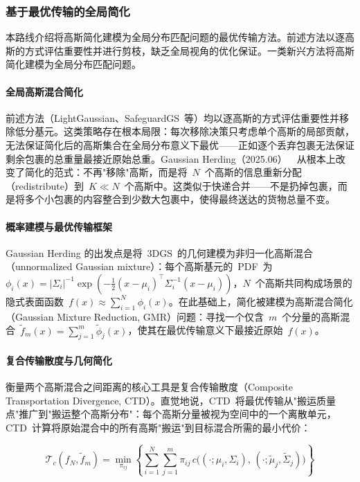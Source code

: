 \subsubsection{基于最优传输的全局简化}

本路线介绍将高斯简化建模为全局分布匹配问题的最优传输方法。前述方法以逐高斯的方式评估重要性并进行剪枝，缺乏全局视角的优化保证。一类新兴方法将高斯简化建模为全局分布匹配问题。

\paragraph{全局高斯混合简化}

前述方法（LightGaussian、SafeguardGS~等）均以逐高斯的方式评估重要性并移除低分基元。这类策略存在根本局限：每次移除决策只考虑单个高斯的局部贡献，无法保证简化后的高斯集合在全局分布意义下最优——正如逐个丢弃包裹无法保证剩余包裹的总重量最接近原始总重。Gaussian Herding（2025.06）~\cite{2506_09534}~从根本上改变了简化的范式：不再"移除"高斯，而是将~$N$~个高斯的信息重新分配（redistribute）到~$K \ll N$~个高斯中。这类似于快递合并——不是扔掉包裹，而是将多个小包裹的内容整合到少数大包裹中，使得最终送达的货物总量不变。

\paragraph{概率建模与最优传输框架}

Gaussian Herding 的出发点是将~3DGS~的几何建模为非归一化高斯混合（unnormalized Gaussian mixture）：每个高斯基元的~PDF~为~$\phi_i(x) = |\Sigma_i|^{-1} \exp(-\frac{1}{2}(x - \mu_i)^\top \Sigma_i^{-1}(x - \mu_i))$，$N$~个高斯共同构成场景的隐式表面函数~$f(x) \approx \sum_{i=1}^N \phi_i(x)$。在此基础上，简化被建模为高斯混合简化（Gaussian Mixture Reduction, GMR）问题：寻找一个仅含~$m$~个分量的高斯混合~$\tilde{f}_m(x) = \sum_{j=1}^m \tilde{\phi}_j(x)$，使其在最优传输意义下最接近原始~$f(x)$。

\paragraph{复合传输散度与几何简化}

衡量两个高斯混合之间距离的核心工具是复合传输散度（Composite Transportation Divergence, CTD）。直觉地说，CTD~将最优传输从"搬运质量点"推广到"搬运整个高斯分布"：每个高斯分量被视为空间中的一个离散单元，CTD~计算将原始混合中的所有高斯"搬运"到目标混合所需的最小代价：

\begin{equation}
\mathcal{T}_c(f_N, \tilde{f}_m) = \min_{\pi_{ij}} \left\{ \sum_{i=1}^N \sum_{j=1}^m \pi_{ij} \, c\bigl((\cdot;\mu_i,\Sigma_i),\, (\cdot;\tilde{\mu}_j,\tilde{\Sigma}_j)\bigr) \right\}
\label{eq:ch11_ctd}
\end{equation}

